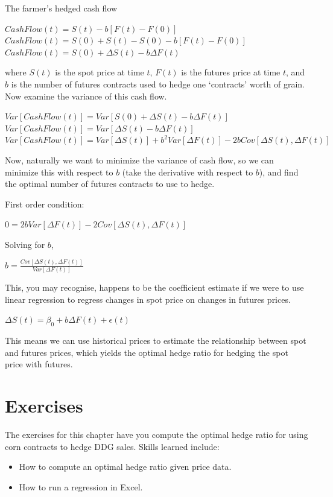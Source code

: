 \documentclass[
  letterpaper,
  DIV=11,
  numbers=noendperiod]{scrreprt}
\begin{document}
The farmer's hedged cash flow

\(CashFlow(t) = S(t) - b[F(t) - F(0)]\)\\
\(CashFlow(t) = S(0) + S(t) - S(0) - b[F(t) - F(0)]\)\\
\(CashFlow(t) = S(0) + \Delta S(t) - b\Delta F(t)\)

where \(S(t)\) is the spot price at time \(t\), \(F(t)\) is the futures
price at time \(t\), and \(b\) is the number of futures contracts used
to hedge one `contracts' worth of grain. Now examine the variance of
this cash flow.

\(Var[CashFlow(t)] = Var[S(0) + \Delta S(t) - b\Delta F(t)]\)\\
\(Var[CashFlow(t)] = Var[\Delta S(t) - b\Delta F(t)]\)\\
\(Var[CashFlow(t)] = Var[\Delta S(t)] + b^2Var[\Delta F(t)] - 2bCov[\Delta S(t),\Delta F(t)]\)

Now, naturally we want to minimize the variance of cash flow, so we can
minimize this with respect to \(b\) (take the derivative with respect to
\(b\)), and find the optimal number of futures contracts to use to
hedge.

First order condition:

\(0 = 2bVar[\Delta F(t)] - 2Cov[\Delta S(t),\Delta F(t)]\)

Solving for \(b\),

\(b = \frac{Cov[\Delta S(t),\Delta F(t)]}{Var[\Delta F(t)]}\)

This, you may recognise, happens to be the coefficient estimate if we
were to use linear regression to regress changes in spot price on
changes in futures prices.

\(\Delta S(t) = \beta_0 + b\Delta F(t) + \epsilon(t)\)

This means we can use historical prices to estimate the relationship
between spot and futures prices, which yields the optimal hedge ratio
for hedging the spot price with futures.

\hypertarget{exercises-6}{%
\section{Exercises}\label{exercises-6}}

The exercises for this chapter have you compute the optimal hedge ratio
for using corn contracts to hedge DDG sales. Skills learned include:

\begin{itemize}
\item
  How to compute an optimal hedge ratio given price data.
\item
  How to run a regression in Excel.
\end{itemize}
\end{document}
